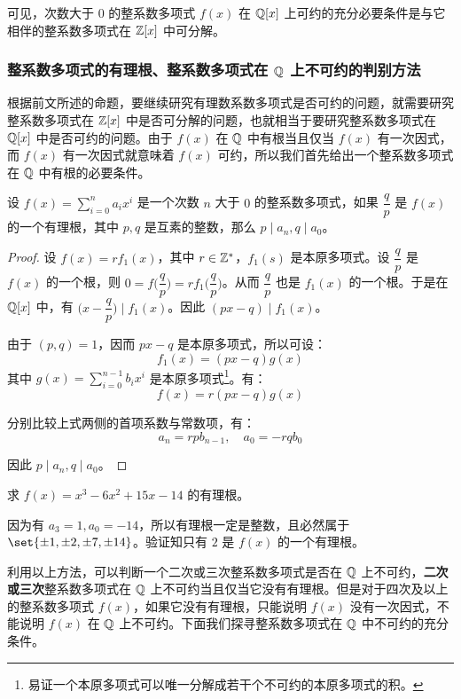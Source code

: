 可见，次数大于 $0$ 的整系数多项式 $f(x)$ 在 $\mathbb Q[x]$ 上可约的充分必要条件是与它相伴的整系数多项式在 $\mathbb Z[x]$ 中可分解。

\subsubsection{整系数多项式的有理根、整系数多项式在 $\mathbb Q$ 上不可约的判别方法}

根据前文所述的命题，要继续研究有理数系数多项式是否可约的问题，就需要研究整系数多项式在 $\mathbb Z[x]$ 中是否可分解的问题，也就相当于要研究整系数多项式在 $\mathbb Q[x]$ 中是否可约的问题。由于 $f(x)$ 在 $\mathbb Q$ 中有根当且仅当 $f(x)$ 有一次因式，而 $f(x)$ 有一次因式就意味着 $f(x)$ 可约，所以我们首先给出一个整系数多项式在 $\mathbb Q$ 中有根的必要条件。

\begin{proposition}
	设 $f(x) = \sum\limits_{i = 0}^n a_i x^i$ 是一个次数 $n$ 大于 $0$ 的整系数多项式，如果 $\dfrac{q}{p}$ 是 $f(x)$ 的一个有理根，其中 $p, q$ 是互素的整数，那么 $p \mid a_n, q \mid a_0$。
\end{proposition}

\begin{proof}
	设 $f(x) = r f_1(x)$，其中 $r \in \mathbb Z^*$，$f_1(s)$ 是本原多项式。设 $\dfrac{q}{p}$ 是 $f(x)$ 的一个根，则 $0 = f \biggl( \dfrac{q}{p} \biggr) = r f_1 \biggl( \dfrac{q}{p} \biggr)$。从而 $\dfrac{q}{p}$ 也是 $f_1(x)$ 的一个根。于是在 $\mathbb Q[x]$ 中，有 $\biggl( x - \dfrac{q}{p} \biggr) \mid f_1(x)$。因此 $(px - q) \mid f_1(x)$。

	由于 $(p, q) = 1$，因而 $px - q$ 是本原多项式，所以可设：
	$$
	f_1(x) = (px - q) g(x)
	$$
	其中 $g(x) = \sum\limits_{i = 0}^{n - 1} b_i x^i$ 是本原多项式\footnote{易证一个本原多项式可以唯一分解成若干个不可约的本原多项式的积。}。有：
	$$
	f(x) = r (px - q) g(x)
	$$

	分别比较上式两侧的首项系数与常数项，有：
	$$
	a_n = r p b_{n - 1}, \quad a_0 = - r q b_0
	$$

	因此 $p \mid a_n, q \mid a_0$。
\end{proof}

\begin{example}
	求 $f(x) = x^3 - 6 x^2 + 15 x - 14$ 的有理根。

	因为有 $a_3 = 1, a_0 = -14$，所以有理根一定是整数，且必然属于 $\set{\pm 1, \pm 2, \pm 7, \pm 14}$。验证知只有 $2$ 是 $f(x)$ 的一个有理根。
\end{example}

利用以上方法，可以判断一个二次或三次整系数多项式是否在 $\mathbb Q$ 上不可约，\textbf{二次或三次}整系数多项式在 $\mathbb Q$ 上不可约当且仅当它没有有理根。但是对于四次及以上的整系数多项式 $f(x)$，如果它没有有理根，只能说明 $f(x)$ 没有一次因式，不能说明 $f(x)$ 在 $\mathbb Q$ 上不可约。下面我们探寻整系数多项式在 $\mathbb Q$ 中不可约的充分条件。

